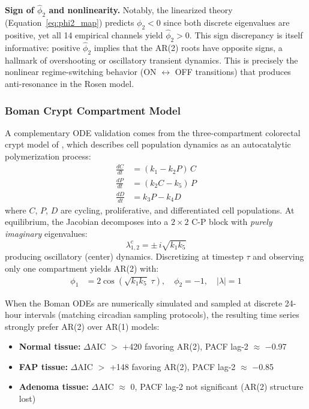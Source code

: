 \documentclass[11pt,a4paper]{article}
\begin{document}
\textbf{Sign of $\hat{\phi}_2$ and nonlinearity.} Notably, the linearized theory (Equation~\ref{eq:phi2_map}) predicts $\phi_2 < 0$ since both discrete eigenvalues are positive, yet all 14 empirical channels yield $\hat{\phi}_2 > 0$. This sign discrepancy is itself informative: positive $\hat{\phi}_2$ implies that the AR(2) roots have opposite signs, a hallmark of overshooting or oscillatory transient dynamics. This is precisely the nonlinear regime-switching behavior (ON $\leftrightarrow$ OFF transitions) that produces anti-resonance in the Rosen model.

\subsubsection*{Boman Crypt Compartment Model}

A complementary ODE validation comes from the three-compartment colorectal crypt model of \citet{boman2025}, which describes cell population dynamics as an autocatalytic polymerization process:
\begin{align}
\frac{dC}{dt} &= (k_1 - k_2 P)\,C \label{eq:boman_C} \\
\frac{dP}{dt} &= (k_2 C - k_5)\,P \label{eq:boman_P} \\
\frac{dD}{dt} &= k_3 P - k_4 D \label{eq:boman_D}
\end{align}
where $C$, $P$, $D$ are cycling, proliferative, and differentiated cell populations. At equilibrium, the Jacobian decomposes into a $2 \times 2$ C-P block with \textit{purely imaginary} eigenvalues:
\begin{equation}
\lambda_{1,2}^c = \pm\, i\sqrt{k_1 k_5}
\label{eq:boman_eigenvalues}
\end{equation}
producing oscillatory (center) dynamics. Discretizing at timestep $\tau$ and observing only one compartment yields AR(2) with:
\begin{align}
\phi_1 &= 2\cos\!\left(\sqrt{k_1 k_5}\;\tau\right), \quad
\phi_2 = -1, \quad
|\lambda| = 1
\label{eq:boman_ar2}
\end{align}

When the Boman ODEs are numerically simulated and sampled at discrete 24-hour intervals (matching circadian sampling protocols), the resulting time series strongly prefer AR(2) over AR(1) models:
\begin{itemize}
    \item \textbf{Normal tissue:} $\Delta$AIC $>$ +420 favoring AR(2), PACF lag-2 $\approx$ $-$0.97
    \item \textbf{FAP tissue:} $\Delta$AIC $>$ +148 favoring AR(2), PACF lag-2 $\approx$ $-$0.85
    \item \textbf{Adenoma tissue:} $\Delta$AIC $\approx$ 0, PACF lag-2 not significant (AR(2) structure lost)
\end{itemize}
\end{document}
